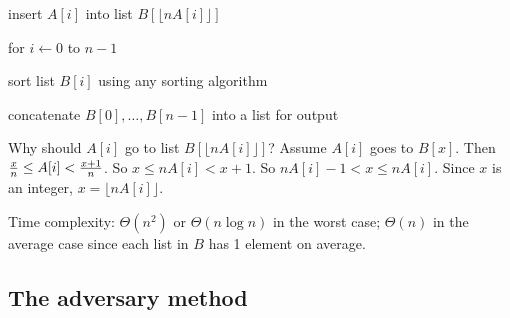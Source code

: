 \documentclass{article}
\begin{document}
\begin{itemize}
\qquad\qquad insert $A[i]$ into list $B[\lfloor nA[i]\rfloor]$

\qquad for $i\leftarrow 0$ to $n-1$

\qquad\qquad sort list $B[i]$ using any sorting algorithm

\qquad concatenate $B[0],\ldots,B[n-1]$ into a list for output

Why should $A[i]$ go to list $B[\lfloor nA[i]\rfloor]$? Assume 
$A[i]$ goes to $B[x]$. Then ${x\over n}\le A[i]<{x+1\over n}$.
So $x\le nA[i]<x+1$. So $nA[i]-1<x\le nA[i]$. Since $x$ is an
integer, $x=\lfloor nA[i]\rfloor$.

Time complexity: $\Theta(n^2)$ or $\Theta(n\log n)$ in the worst case;
$\Theta(n)$ in the average case since each list in $B$ has 1 element
on average.
 
\end{itemize}

\subsection{The adversary method}
\end{document}
